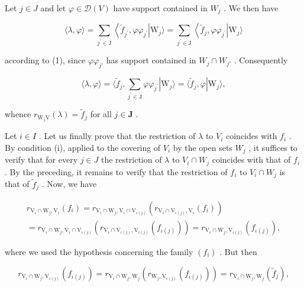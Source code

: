 Let \(j \in J\) and let \(\varphi \in \mathcal{D}(V)\) have support contained in \(W_{j}\) . We then have

\[
\langle \lambda , \varphi \rangle = \sum_ {j ^ {\prime} \in \mathrm{J}} \left\langle \widetilde {f} _ {j ^ {\prime}}, \varphi \varphi_ {j ^ {\prime}} \right| \mathrm{W} _ {j} \rangle = \sum_ {j ^ {\prime} \in \mathrm{J}} \left\langle \widetilde {f} _ {j}, \varphi \varphi_ {j ^ {\prime}} \right| \mathrm{W} _ {j} \rangle
\]

according to (1), since \(\varphi\varphi_{j'}\) has support contained in \(W_j \cap W_{j'}\) . Consequently

\[
\langle \lambda , \varphi \rangle = \langle \widetilde {f} _ {j}, \sum_ {j ^ {\prime} \in \mathrm{J}} \varphi \varphi_ {j ^ {\prime}} | \mathrm{W} _ {j} \rangle = \langle \widetilde {f} _ {j}, \varphi | \mathrm{W} _ {j} \rangle ,
\]

whence \(r_{\mathrm{W}_j\mathrm{V}}(\lambda) = \widetilde{f}_j\) for all \(j\in \mathbf{J}\) .

Let \(i \in I\) . Let us finally prove that the restriction of \(\lambda\) to \(V_i\) coincides with \(f_i\) . By condition (i), applied to the covering of \(V_i\) by the open sets \(W_j\) , it suffices to verify that for every \(j \in J\) the restriction of \(\lambda\) to \(V_i \cap W_j\) coincides with that of \(f_i\) . By the preceding, it remains to verify that the restriction of \(f_i\) to \(V_i \cap W_j\) is that of \(\widetilde{f}_j\) . Now, we have

\[
\begin{array}{c} r _ {\mathrm{V} _ {i} \cap \mathrm{W} _ {j}, \mathrm{V} _ {i}} (f _ {i}) = r _ {\mathrm{V} _ {i} \cap \mathrm{W} _ {j}, \mathrm{V} _ {i} \cap \mathrm{V} _ {\iota (j)}} (r _ {\mathrm{V} _ {i} \cap \mathrm{V} _ {\iota (j)}, \mathrm{V} _ {i}} (f _ {i})) \\ = r _ {\mathrm{V} _ {i} \cap \mathrm{W} _ {j}, \mathrm{V} _ {i} \cap \mathrm{V} _ {\iota (j)}} (r _ {\mathrm{V} _ {i} \cap \mathrm{V} _ {\iota (j)}, \mathrm{V} _ {\iota (j)}} (f _ {\iota (j)})) = r _ {\mathrm{V} _ {i} \cap \mathrm{W} _ {j}, \mathrm{V} _ {\iota (j)}} (f _ {\iota (j)}), \end{array}
\]

where we used the hypothesis concerning the family \((f_{i})\) . But then

\[
r _ {\mathrm{V} _ {i} \cap \mathrm{W} _ {j}, \mathrm{V} _ {\iota (j)}} (f _ {\iota (j)}) = r _ {\mathrm{V} _ {i} \cap \mathrm{W} _ {j}, \mathrm{W} _ {j}} (r _ {\mathrm{W} _ {j}, \mathrm{V} _ {\iota (j)}} (f _ {\iota (j)})) = r _ {\mathrm{V} _ {i} \cap \mathrm{W} _ {j}, \mathrm{W} _ {j}} (\widetilde {f} _ {j}),
\]

